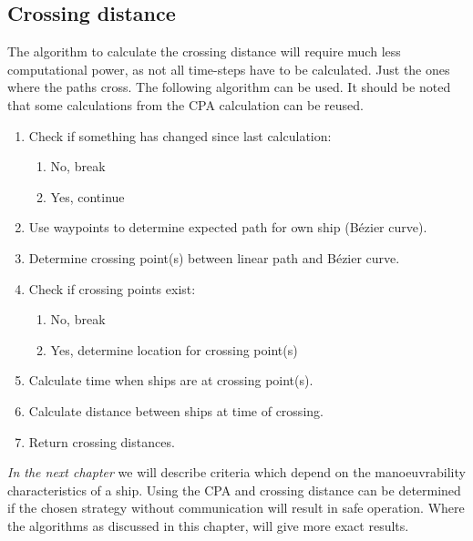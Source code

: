 \subsection{Crossing distance}
The algorithm to calculate the crossing distance will require much less computational power, as not all time-steps have to be calculated. Just the ones where the paths cross. The following algorithm can be used. It should be noted that some calculations from the CPA calculation can be reused.
\begin{enumerate}
	\item Check if something has changed since last calculation:
	\begin{enumerate}
		\item No, break
		\item Yes, continue
	\end{enumerate}
	\item Use waypoints to determine expected path for own ship (Bézier curve).
	\item Determine crossing point(s) between linear path and Bézier curve.
	\item Check if crossing points exist:
	\begin{enumerate}
		\item No, break
		\item Yes, determine location for crossing point(s)
	\end{enumerate}
	\item Calculate time when ships are at crossing point(s).
	\item Calculate distance between ships at time of crossing.
	\item Return crossing distances.
\end{enumerate}

\vspace{1.5cm}
\emph{In the next chapter} we will describe criteria which depend on the manoeuvrability characteristics of a ship. Using the \ac{CPA} and crossing distance can be determined if the chosen strategy without communication will result in safe operation. Where the algorithms as discussed in this chapter, will give more exact results.

